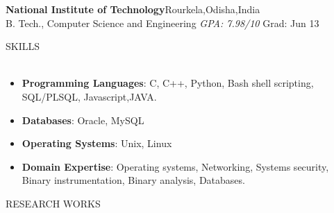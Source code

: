 \documentclass[a4paper]{article}
\newcommand{\lineunder} {
    \vspace*{-8pt} \\
    \hspace*{-18pt} \hrulefill \\
}
\newcommand{\header} [1] {
    {\hspace*{-18pt}\vspace*{6pt} \textsc{#1}}
    \vspace*{-6pt} \lineunder
}
\begin{document}
\textbf{National Institute of Technology}\hfill Rourkela,Odisha,India\\
B. Tech., Computer Science and Engineering \textit{GPA: 7.98/10} \hfill Grad: Jun 13\newline \newline
\header{SKILLS}
\begin{itemize}
  \itemsep0em
    \item \textbf{Programming Languages}: C, C++, Python, Bash shell scripting,
     SQL/PLSQL, Javascript,JAVA.
	\item \textbf{Databases}: Oracle, MySQL
	\item \textbf{Operating Systems}: Unix, Linux
    \item \textbf{Domain Expertise}: Operating systems, Networking, Systems
    security, Binary instrumentation, Binary analysis, Databases.
\end{itemize}
\header{RESEARCH WORKS}
\end{document}
